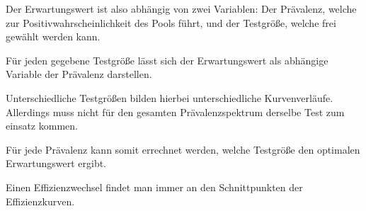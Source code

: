 Der Erwartungswert ist also abhängig von zwei Variablen: Der Prävalenz, welche zur Positivwahrscheinlichkeit des Pools führt, und der Testgröße, welche frei gewählt werden kann.

Für jeden gegebene Testgröße lässt sich der Erwartungswert als abhängige Variable der Prävalenz darstellen.

Unterschiedliche Testgrößen bilden hierbei unterschiedliche Kurvenverläufe.
Allerdings muss nicht für den gesamten Prävalenzspektrum derselbe Test zum einsatz kommen.

Für jede Prävalenz kann somit errechnet werden, welche Testgröße den optimalen Erwartungswert ergibt.

Einen Effizienzwechsel findet man immer an den Schnittpunkten der Effizienzkurven.


\cleardoublepage
